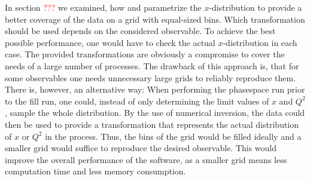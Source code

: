 In section \textcolor{red}{???} we examined, how \appl{} and \fnlo{} parametrize the $x$-distribution to provide a better coverage of the data on a grid with equal-sized bins.
Which transformation should be used depends on the considered observable.
To achieve the best possible performance, one would have to check the actual $x$-distribution in each case.
The provided transformations are obviously a compromise to cover the needs of a large number of processes.
The drawback of this approach is, that for some observables one needs unnecessary large grids to reliably reproduce them.
There is, however, an alternative way: When performing the phasespace run prior to the fill run, one could, instead of only determining the limit values of $x$ and $Q^2$, sample the whole distribution.
By the use of numerical inversion, the data could then be used to provide a transformation that represents the actual distribution of $x$ or $Q^2$ in the process.
Thus, the bins of the grid would be filled ideally and a smaller grid would suffice to reproduce the desired observable.
This would improve the overall performance of the software, as a smaller grid means less computation time and less memory consumption.

